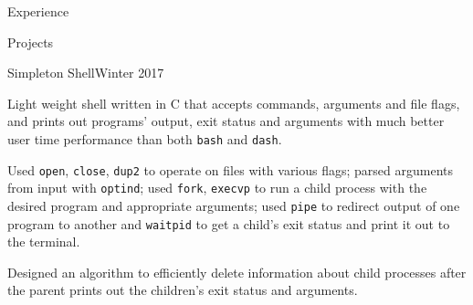 \documentclass{resume} %
\begin{document}
\begin{rSection}{Experience}


\end{rSection}


\begin{rSection}{Projects}

\begin{rSubsection}{Simpleton Shell}{Winter 2017}{}{}
\item {Light weight shell written in C that accepts commands, arguments and file flags, and prints out programs' output, exit status and arguments with much better user time performance than both \texttt{bash} and \texttt{dash}.}
\item {Used \texttt{open}, \texttt{close}, \texttt{dup2} to operate on files with various flags; parsed arguments from input with \texttt{optind}; used \texttt{fork}, \texttt{execvp} to run a child process with the desired program and appropriate arguments; used \texttt{pipe} to redirect output of one program to another and \texttt{waitpid} to get a child's exit status and print it out to the terminal.}
\item {Designed an algorithm to efficiently delete information about child processes after the parent prints out the children's exit status and arguments.}
\end{rSubsection}


\end{rSection}
\end{document}
